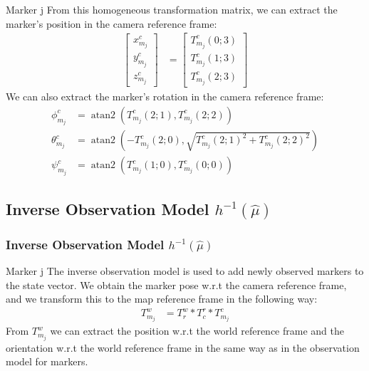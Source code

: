 \documentclass{beamer}
\DeclareMathOperator{\atantwo}{atan2}
\begin{document}
    \begin{frame}
        \begin{block}{Marker j}
            From this homogeneous transformation matrix, we can extract the marker's position in the camera reference frame:
            \begin{align*}
                \begin{bmatrix} x_{m_j}^c \\ y_{m_j}^c \\ z_{m_j}^c \end{bmatrix} &= \begin{bmatrix} T_{m_j}^c(0;3) \\ T_{m_j}^c(1;3) \\ T_{m_j}^c(2;3) \end{bmatrix}
            \end{align*}
            We can also extract the marker's rotation in the camera reference frame:
            \begin{align*}
                \phi_{m_j}^c &= \atantwo\left(T_{m_j}^c(2;1), T_{m_j}^c(2;2)\right) \\
                \theta_{m_j}^c &= \atantwo\left(-T_{m_j}^c(2;0), \sqrt{T_{m_j}^c(2;1)^2 + T_{m_j}^c(2;2)^2}\right) \\
                \psi_{m_j}^c &= \atantwo\left(T_{m_j}^c(1;0), T_{m_j}^c(0;0)\right)
            \end{align*}
        \end{block}
    \end{frame}

    \subsection{Inverse Observation Model $h^{-1} \left( \hat\mu \right)$}
    \begin{frame}
        \justifying
        \frametitle{Inverse Observation Model $h^{-1} \left( \hat\mu \right)$}
        \begin{block}{Marker j}
            The inverse observation model is used to add newly observed markers to the state vector. We obtain the marker pose w.r.t the camera reference frame, and we transform this to the map reference frame in the following way:
            \begin{align*}
            T_{m_j}^w &= T_r^w * T_c^r * T_{m_j}^c
            \end{align*}
            From $T_{m_j}^w$ we can extract the position w.r.t the world reference frame and the orientation w.r.t the world reference frame in the same way as in the observation model for markers.

        \end{block}
    \end{frame}
\end{document}
